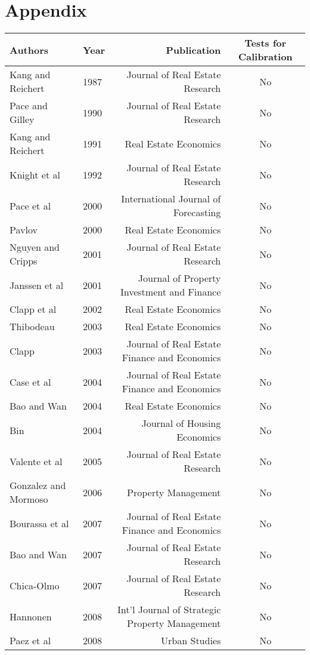 \documentclass[colTwo]{anon}
\theoremstyle{definition}
\begin{document}
\section{Appendix}

\begin{table}[h!]
\centering
\begin{tabular}{|l|l|r|c|}
\hline
\textbf{Authors} & \textbf{Year} & \textbf{Publication} & \textbf{Tests for Calibration}\\
\hline
Kang and Reichert & 1987 & Journal of Real Estate Research & No \\
Pace and Gilley & 1990 & Journal of Real Estate Research & No \\
Kang and Reichert & 1991 & Real Estate Economics & No \\
Knight et al & 1992 & Journal of Real Estate Research & No \\
Pace et al & 2000 & International Journal of Forecasting & No \\
Pavlov & 2000 & Real Estate Economics & No \\
Nguyen and Cripps & 2001 & Journal of Real Estate Research & No \\
Janssen et al & 2001 & Journal of Property Investment and Finance & No \\
Clapp et al & 2002 & Real Estate Economics & No \\
Thibodeau & 2003 & Real Estate Economics & No \\
Clapp & 2003 & Journal of Real Estate Finance and Economics & No \\
Case et al & 2004 & Journal of Real Estate Finance and Economics & No \\
Bao and Wan & 2004 & Real Estate Economics & No \\
Bin & 2004 & Journal of Housing Economics & No \\
Valente et al & 2005 & Journal of Real Estate Research & No \\
Gonzalez and Mormoso & 2006 & Property Management & No \\
Bourassa et al & 2007 & Journal of Real Estate Finance and Economics & No \\
Bao and Wan & 2007 & Journal of Real Estate Research & No \\
Chica-Olmo & 2007 & Journal of Real Estate Research & No \\
Hannonen & 2008 & Int'l Journal of Strategic Property Management & No \\
Paez et al & 2008 & Urban Studies & No \\

\end{tabular}
\end{table}
\end{document}
